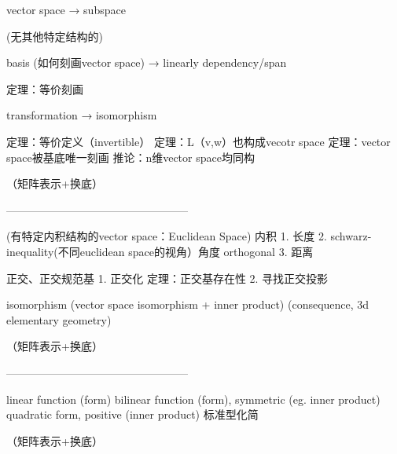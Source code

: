 vector space → subspace

(无其他特定结构的)

basis (如何刻画vector space) → linearly dependency/span

定理：等价刻画

transformation → isomorphism

定理：等价定义（invertible）
定理：L（v,w）也构成vecotr space
定理：vector space被基底唯一刻画
    推论：n维vector space均同构
    
（矩阵表示+换底）

--------------------------------------------------

(有特定内积结构的vector space：Euclidean Space)
内积
    1. 长度
    2. schwarz-inequality(不同euclidean space的视角）角度 orthogonal
    3. 距离

正交、正交规范基
    1. 正交化 定理：正交基存在性
    2. 寻找正交投影
    
isomorphism (vector space isomorphism + inner product) (consequence, 3d elementary geometry)

（矩阵表示+换底）

--------------------------------------------------

linear function (form)
bilinear function (form), symmetric (eg. inner product)
quadratic form, positive (inner product) 标准型化简

（矩阵表示+换底）
